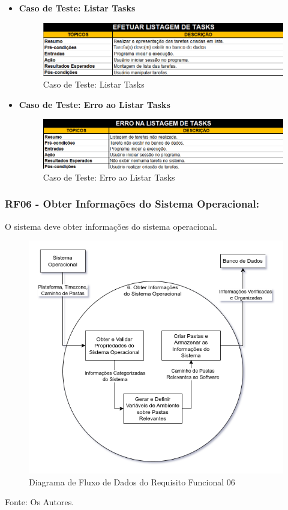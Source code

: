 \documentclass[a4paper,12pt]{article}
\begin{document}
\begin{itemize}
	\item\textbf{Caso de Teste: Listar Tasks}
	\begin{figure}
		\centering
		\includegraphics[scale=0.75]{UnitTest/trueCase/listTask.png}
		\caption{Caso de Teste: Listar Tasks}
	\end{figure}
	\item\textbf{Caso de Teste: Erro ao Listar Tasks}
	\begin{figure}
		\centering
		\includegraphics[scale=0.75]{UnitTest/falseCase/listTask.png}
		\caption{Caso de Teste: Erro ao Listar Tasks}
	\end{figure}
\end{itemize}

\pagebreak
\subsubsection{RF06 - Obter Informações do Sistema Operacional:}
O sistema deve obter informações do sistema operacional.
\begin{figure}[H]
	\centering
	\includegraphics[scale=0.45]{DFDs/RF06.drawio.png}
	\caption{Diagrama de Fluxo de Dados do Requisito Funcional 06}
\end{figure}
\noindent Fonte: Os Autores.
\end{document}
